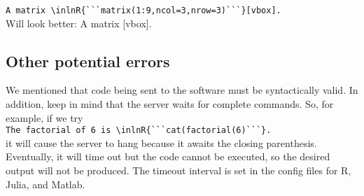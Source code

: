 \documentclass[a4paper,10pt]{article}
\begin{document}
\verb|A matrix \inlnR{```matrix(1:9,ncol=3,nrow=3)```}[vbox].|\\
Will look better: A matrix [vbox].

\subsection*{Other potential errors}
We mentioned that code being sent to the software must be syntactically valid. In addition, keep in mind that the server waits for complete commands. So, for example, if we try\\
\verb|The factorial of 6 is \inlnR{```cat(factorial(6)```}.|\\
it will cause the server to hang because it awaits the closing parenthesis. Eventually, it will time out but the code cannot be executed, so the desired output will not be produced. The timeout interval is set in the config files for R, Julia, and Matlab.


\end{document}
